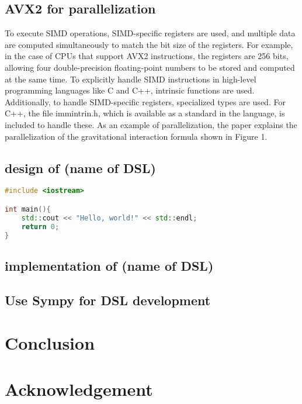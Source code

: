 \documentclass[ams]{U-AizuGT}
\begin{document}
\subsection{AVX2 for parallelization}
To execute SIMD operations, SIMD-specific registers are used, 
and multiple data are computed simultaneously to match the bit 
size of the registers. For example, in the case of CPUs that 
support AVX2 instructions, the registers are 256 bits, allowing 
four double-precision floating-point numbers to be stored and 
computed at the same time. To explicitly handle SIMD instructions
 in high-level programming languages like C and C++, intrinsic 
 functions are used. Additionally, to handle SIMD-specific registers, 
 specialized types are used. For C++, the file immintrin.h, 
 which is available as a standard in the language, is included to 
 handle these. As an example of parallelization, the paper explains
  the parallelization of the gravitational interaction formula shown 
  in Figure 1.


\subsection{design of (name of DSL)}

\begin{lstlisting}[language=c++]
#include <iostream>

int main(){
    std::cout << "Hello, world!" << std::endl;
    return 0;
}
\end{lstlisting}
\subsection{implementation of (name of DSL)}



\subsection{Use Sympy for DSL development}

\section{Conclusion}
\section{Acknowledgement}

\end{document}
